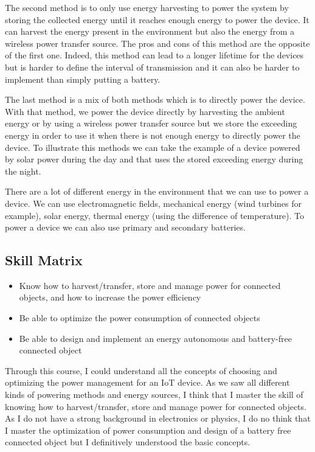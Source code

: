 The second method is to only use energy harvesting to power the system by storing the collected energy until it reaches enough energy to power the device. It can harvest the energy present in the environment but also the energy from a wireless power transfer source. The pros and cons of this method are the opposite of the first one. Indeed, this method can lead to a longer lifetime for the devices but is harder to define the interval of transmission and it can also be harder to implement than simply putting a battery. 
\\\par

The last method is a mix of both methods which is to directly power the device. With that method, we power the device directly by harvesting the ambient energy or by using a wireless power transfer source but we store the exceeding energy in order to use it when there is not enough energy to directly power the device. To illustrate this methods we can take the example of a device powered by solar power during the day and that uses the stored exceeding energy during the night.
\\\par

There are a lot of different energy in the environment that we can use to power a device. We can use electromagnetic fields, mechanical energy (wind turbines for example), solar energy, thermal energy (using the difference of temperature). To power a device we can also use primary and secondary batteries.

\subsection{Skill Matrix}

\begin{itemize}
    \item Know how to harvest/transfer, store and manage power for connected objects, and how to increase the power efficiency
    \item Be able to optimize the power consumption of connected objects
    \item Be able to design and implement an energy autonomous and battery-free connected object
\end{itemize}

Through this course, I could understand all the concepts of choosing and optimizing the power management for an IoT device. As we saw all different kinds of powering methods and energy sources, I think that I master the skill of knowing how to harvest/transfer, store and manage power for connected objects. As I do not have a strong background in electronics or physics, I do no think that I master the optimization of  power consumption and design of a battery free connected object but I definitively understood the basic concepts.


